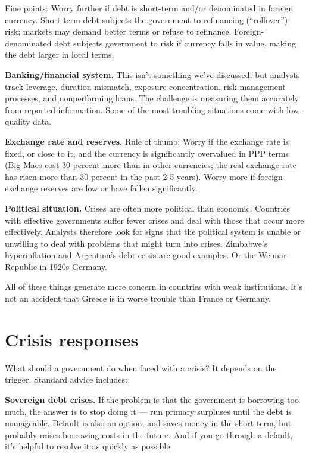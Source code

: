 Fine points:  Worry further if debt is short-term and/or denominated in foreign currency.
Short-term debt subjects the government to refinancing (``rollover'') risk;
markets may demand better terms or refuse to refinance.
Foreign-denominated debt subjects government to risk
if currency falls in value, making the debt larger in local terms.

\textbf{Banking/financial system.}
This isn't something we've discussed,
but  analysts track leverage, duration mismatch, exposure concentration,
risk-management processes,
and nonperforming loans.
The challenge is measuring them accurately from reported information.
Some of the most troubling situations come with low-quality data.


\textbf{Exchange rate and reserves.}
Rule of thumb:  Worry if the exchange rate is fixed, or close to it,
and the currency is significantly overvalued in PPP terms
(Big Macs cost 30 percent more than in other currencies;
the real exchange rate has risen more than 30 percent in the past 2-5 years).
Worry more if foreign-exchange reserves
are low or have fallen significantly.

\textbf{Political situation.}
Crises are often more political than economic.
Countries with effective governments suffer fewer crises and
deal with those that occur more effectively.
Analysts therefore look for signs that the political
system is unable or unwilling to deal with problems that might turn into crises.
Zimbabwe's hyperinflation and Argentina's debt crisis are good examples.
Or the Weimar Republic in 1920s Germany.

All of these things generate more concern
in countries with weak institutions.
It's not an accident that Greece is in worse trouble
than France or Germany.


\section{Crisis responses}

What should a government do when faced with a crisis?
It depends on the trigger.
Standard advice includes:

\textbf{Sovereign debt crises.}
If the problem is that the government is borrowing too much,
the answer is to stop doing it --- run primary surpluses until the debt is manageable.
Default is also an option, and saves money in the short term,
but probably raises borrowing costs in the future.
And if you go through a default, it's helpful to resolve it as quickly as possible.

